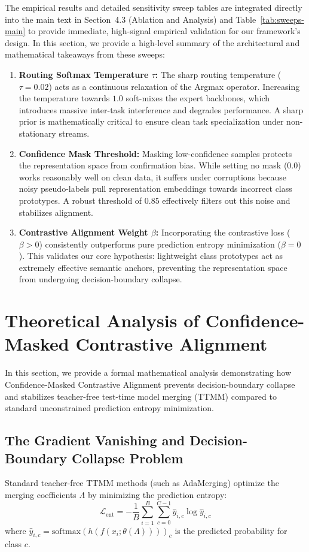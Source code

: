 \documentclass{article}
\theoremstyle{plain}
\theoremstyle{definition}
\theoremstyle{remark}
\begin{document}
The empirical results and detailed sensitivity sweep tables are integrated directly into the main text in Section~4.3 (Ablation and Analysis) and Table~\ref{tab:sweeps-main} to provide immediate, high-signal empirical validation for our framework's design. In this section, we provide a high-level summary of the architectural and mathematical takeaways from these sweeps:
\begin{enumerate}
    \item \textbf{Routing Softmax Temperature $\tau$:} The sharp routing temperature ($\tau = 0.02$) acts as a continuous relaxation of the Argmax operator. Increasing the temperature towards $1.0$ soft-mixes the expert backbones, which introduces massive inter-task interference and degrades performance. A sharp prior is mathematically critical to ensure clean task specialization under non-stationary streams.
    \item \textbf{Confidence Mask Threshold:} Masking low-confidence samples protects the representation space from confirmation bias. While setting no mask ($0.0$) works reasonably well on clean data, it suffers under corruptions because noisy pseudo-labels pull representation embeddings towards incorrect class prototypes. A robust threshold of $0.85$ effectively filters out this noise and stabilizes alignment.
    \item \textbf{Contrastive Alignment Weight $\beta$:} Incorporating the contrastive loss ($\beta > 0$) consistently outperforms pure prediction entropy minimization ($\beta = 0$). This validates our core hypothesis: lightweight class prototypes act as extremely effective semantic anchors, preventing the representation space from undergoing decision-boundary collapse.
\end{enumerate}

\section{Theoretical Analysis of Confidence-Masked Contrastive Alignment}
\label{appendix-contra-math}

In this section, we provide a formal mathematical analysis demonstrating how Confidence-Masked Contrastive Alignment prevents decision-boundary collapse and stabilizes teacher-free test-time model merging (TTMM) compared to standard unconstrained prediction entropy minimization.

\subsection{The Gradient Vanishing and Decision-Boundary Collapse Problem}
Standard teacher-free TTMM methods (such as AdaMerging) optimize the merging coefficients $\Lambda$ by minimizing the prediction entropy:
\begin{equation}
    \mathcal{L}_{\text{ent}} = - \frac{1}{B} \sum_{i=1}^B \sum_{c=0}^{C-1} \hat{y}_{i, c} \log \hat{y}_{i, c}
\end{equation}
where $\hat{y}_{i, c} = \text{softmax}(h(f(x_i; \theta(\Lambda))))_c$ is the predicted probability for class $c$.
\end{document}
